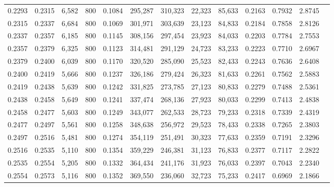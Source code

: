\begin{tabular}{rrrrrrrrrrrrr}
0.2293 & 0.2315 &  6,582 &   800 &                                     0.1084 & 295,287 & 310,323 &  22,323 &  85,633 & 0.2163 & 0.7932 & 2.8745 \\
0.2315 & 0.2337 &  6,684 &   800 &                                     0.1069 & 301,971 & 303,639 &  23,123 &  84,833 & 0.2184 & 0.7858 & 2.8126 \\
0.2337 & 0.2357 &  6,185 &   800 &                                     0.1145 & 308,156 & 297,454 &  23,923 &  84,033 & 0.2203 & 0.7784 & 2.7553 \\
0.2357 & 0.2379 &  6,325 &   800 &                                     0.1123 & 314,481 & 291,129 &  24,723 &  83,233 & 0.2223 & 0.7710 & 2.6967 \\
0.2379 & 0.2400 &  6,039 &   800 &                                     0.1170 & 320,520 & 285,090 &  25,523 &  82,433 & 0.2243 & 0.7636 & 2.6408 \\
0.2400 & 0.2419 &  5,666 &   800 &                                     0.1237 & 326,186 & 279,424 &  26,323 &  81,633 & 0.2261 & 0.7562 & 2.5883 \\
0.2419 & 0.2438 &  5,639 &   800 &                                     0.1242 & 331,825 & 273,785 &  27,123 &  80,833 & 0.2279 & 0.7488 & 2.5361 \\
0.2438 & 0.2458 &  5,649 &   800 &                                     0.1241 & 337,474 & 268,136 &  27,923 &  80,033 & 0.2299 & 0.7413 & 2.4838 \\
0.2458 & 0.2477 &  5,603 &   800 &                                     0.1249 & 343,077 & 262,533 &  28,723 &  79,233 & 0.2318 & 0.7339 & 2.4319 \\
0.2477 & 0.2497 &  5,561 &   800 &                                     0.1258 & 348,638 & 256,972 &  29,523 &  78,433 & 0.2338 & 0.7265 & 2.3803 \\
0.2497 & 0.2516 &  5,481 &   800 &                                     0.1274 & 354,119 & 251,491 &  30,323 &  77,633 & 0.2359 & 0.7191 & 2.3296 \\
0.2516 & 0.2535 &  5,110 &   800 &                                     0.1354 & 359,229 & 246,381 &  31,123 &  76,833 & 0.2377 & 0.7117 & 2.2822 \\
0.2535 & 0.2554 &  5,205 &   800 &                                     0.1332 & 364,434 & 241,176 &  31,923 &  76,033 & 0.2397 & 0.7043 & 2.2340 \\
0.2554 & 0.2573 &  5,116 &   800 &                                     0.1352 & 369,550 & 236,060 &  32,723 &  75,233 & 0.2417 & 0.6969 & 2.1866 \\

\end{tabular}
